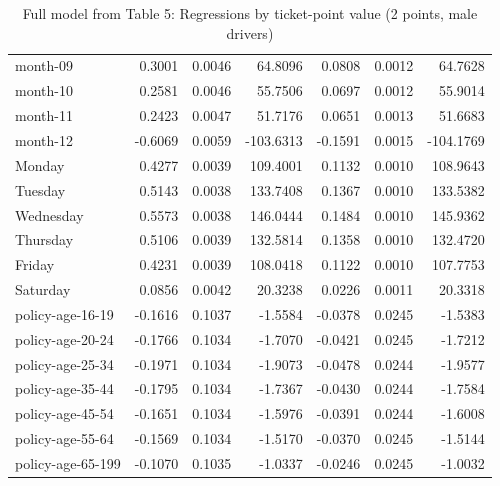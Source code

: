 \documentclass[10pt]{article}
\begin{document}
\begin{table}[ht]
\begin{tabular}{lrrrrrr}
  month-09 & 0.3001 & 0.0046 & 64.8096 & 0.0808 & 0.0012 & 64.7628 \\ 
  month-10 & 0.2581 & 0.0046 & 55.7506 & 0.0697 & 0.0012 & 55.9014 \\ 
  month-11 & 0.2423 & 0.0047 & 51.7176 & 0.0651 & 0.0013 & 51.6683 \\ 
  month-12 & -0.6069 & 0.0059 & -103.6313 & -0.1591 & 0.0015 & -104.1769 \\ 
  Monday & 0.4277 & 0.0039 & 109.4001 & 0.1132 & 0.0010 & 108.9643 \\ 
  Tuesday & 0.5143 & 0.0038 & 133.7408 & 0.1367 & 0.0010 & 133.5382 \\ 
  Wednesday & 0.5573 & 0.0038 & 146.0444 & 0.1484 & 0.0010 & 145.9362 \\ 
  Thursday & 0.5106 & 0.0039 & 132.5814 & 0.1358 & 0.0010 & 132.4720 \\ 
  Friday & 0.4231 & 0.0039 & 108.0418 & 0.1122 & 0.0010 & 107.7753 \\ 
  Saturday & 0.0856 & 0.0042 & 20.3238 & 0.0226 & 0.0011 & 20.3318 \\ 
  policy-age-16-19 & -0.1616 & 0.1037 & -1.5584 & -0.0378 & 0.0245 & -1.5383 \\ 
  policy-age-20-24 & -0.1766 & 0.1034 & -1.7070 & -0.0421 & 0.0245 & -1.7212 \\ 
  policy-age-25-34 & -0.1971 & 0.1034 & -1.9073 & -0.0478 & 0.0244 & -1.9577 \\ 
  policy-age-35-44 & -0.1795 & 0.1034 & -1.7367 & -0.0430 & 0.0244 & -1.7584 \\ 
  policy-age-45-54 & -0.1651 & 0.1034 & -1.5976 & -0.0391 & 0.0244 & -1.6008 \\ 
  policy-age-55-64 & -0.1569 & 0.1034 & -1.5170 & -0.0370 & 0.0245 & -1.5144 \\ 
  policy-age-65-199 & -0.1070 & 0.1035 & -1.0337 & -0.0246 & 0.0245 & -1.0032 \\ 
   \hline
\end{tabular}
\caption{Full model from Table 5: Regressions by ticket-point value (2 points, male drivers)} 
\label{tab_5_2_pts_M}
\end{table}


\clearpage
\pagebreak



\end{document}
